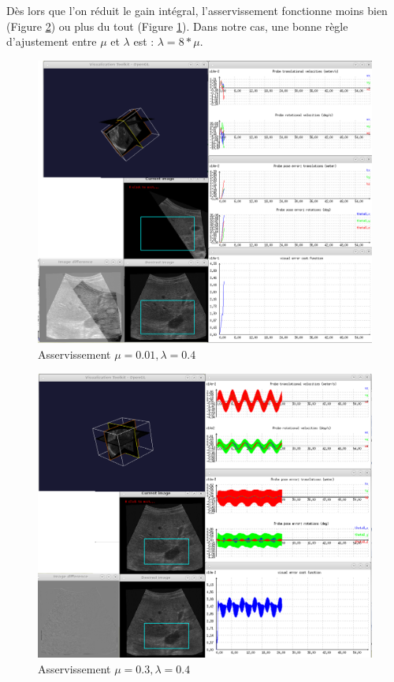\documentclass[a4paper,11pt]{article}
\begin{document}
D\`es lors que l'on r\'eduit le gain int\'egral, l'asservissement fonctionne moins bien (Figure \ref{q12_4}) ou plus du tout (Figure \ref{q12_3}). Dans notre cas, une bonne r\`egle d'ajustement entre $\mu$ et $\lambda$ est : $\lambda = 8*\mu$.
\begin{figure}[H]
    \centering
    \includegraphics[width=0.5\textheight]{./images/q12_mu=0,01.png}
    \caption{Asservissement $\mu = 0.01, \lambda = 0.4$ }
    \label{q12_3}
\end{figure}
\begin{figure}[H]
    \centering
    \includegraphics[width=0.5\textheight]{./images/q12_mu=0,3.png}
    \caption{Asservissement $\mu = 0.3, \lambda = 0.4$ }
    \label{q12_4}
\end{figure}
\end{document}
